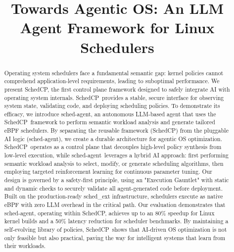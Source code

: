 \documentclass[sigplan,anonymous,10pt]{acmart}
\newcommand{\sys}{SchedCP}
\newcommand{\agent}{sched-agent}
\begin{document}
\title{Towards Agentic OS: An LLM Agent Framework for Linux Schedulers}



\begin{abstract}
  Operating system schedulers face a fundamental semantic gap: kernel policies cannot comprehend application-level requirements, leading to suboptimal performance. We present \sys, the first control plane framework designed to safely integrate AI with operating system internals. \sys\ provides a stable, secure interface for observing system state, validating code, and deploying scheduling policies. To demonstrate its efficacy, we introduce \agent, an autonomous LLM-based agent that uses the \sys\ framework to perform semantic workload analysis and generate tailored eBPF schedulers. By separating the reusable framework (\sys) from the pluggable AI logic (\agent), we create a durable architecture for agentic OS optimization. \sys\ operates as a control plane that decouples high-level policy synthesis from low-level execution, while \agent\ leverages a hybrid AI approach: first performing semantic workload analysis to select, modify, or generate scheduling algorithms, then employing targeted reinforcement learning for continuous parameter tuning. Our design is governed by a safety-first principle, using an "Execution Gauntlet" with static and dynamic checks to securely validate all agent-generated code before deployment. Built on the production-ready sched\_ext infrastructure, schedulers execute as native eBPF with zero LLM overhead in the critical path. Our evaluation demonstrates that \agent, operating within \sys, achieves up to an 80\% speedup for Linux kernel builds and a 50\% latency reduction for scheduler benchmarks. By maintaining a self-evolving library of policies, \sys\ shows that AI-driven OS optimization is not only feasible but also practical, paving the way for intelligent systems that learn from their workloads.
\end{abstract}
\end{document}
